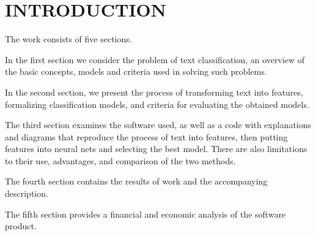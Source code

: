 \chapter*{INTRODUCTION}							%

%
%
%



The work consists of five sections.

In the first section we consider the problem of text classification, an overview of the basic concepts, models and criteria used in solving such problems.

In the second section, we present the process of transforming text into features, formalizing classification models, and criteria for evaluating the obtained models.

The third section examines the software used, as well as a code with explanations and diagrams that reproduce the process of text into features, then putting features into neural nets and selecting the best model. There are also limitations to their use, advantages, and comparison of the two methods.

The fourth section contains the results of work and the accompanying description.

The fifth section provides a financial and economic analysis of the software product.